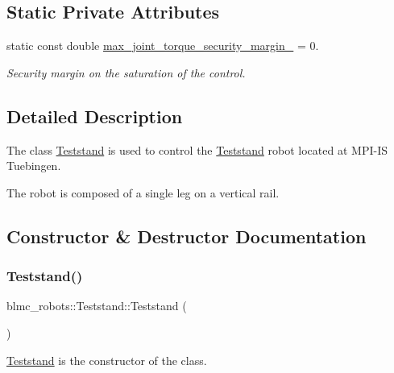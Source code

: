 \subsection*{Static Private Attributes}
\begin{DoxyCompactItemize}
\item 
\mbox{\label{classblmc__robots_1_1Teststand_a401728dd5ba91b8603de79125fcb0a66}} 
static const double \hyperlink{classblmc__robots_1_1Teststand_a401728dd5ba91b8603de79125fcb0a66}{max\+\_\+joint\+\_\+torque\+\_\+security\+\_\+margin\+\_\+} = 0.
\begin{DoxyCompactList}\small\item\em Security margin on the saturation of the control. \end{DoxyCompactList}\end{DoxyCompactItemize}


\subsection{Detailed Description}
The class \hyperlink{classblmc__robots_1_1Teststand}{Teststand} is used to control the \hyperlink{classblmc__robots_1_1Teststand}{Teststand} robot located at M\+P\+I-\/\+IS Tuebingen. 

The robot is composed of a single leg on a vertical rail. 

\subsection{Constructor \& Destructor Documentation}
\mbox{\label{classblmc__robots_1_1Teststand_a4747b0754cd3dd669c02f27662baef7e}} 
\subsubsection{\texorpdfstring{Teststand()}{Teststand()}}
{\footnotesize\ttfamily blmc\+\_\+robots\+::\+Teststand\+::\+Teststand (\begin{DoxyParamCaption}{ }\end{DoxyParamCaption})}



\hyperlink{classblmc__robots_1_1Teststand}{Teststand} is the constructor of the class. 

